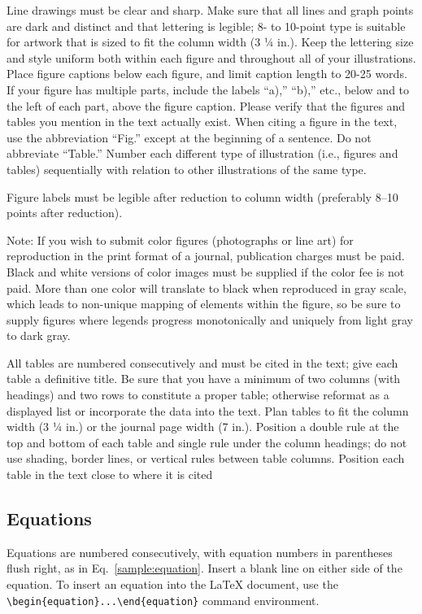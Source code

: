 \documentclass[journal]{new-aiaa}
\begin{document}
Line drawings must be clear and sharp. Make sure that all lines and graph points are dark and distinct and that lettering is legible; 8- to 10-point type is suitable for artwork that is sized to fit the column width (3 ¼ in.). Keep the lettering size and style uniform both within each figure and throughout all of your illustrations. Place figure captions below each figure, and limit caption length to 20-25 words. If your figure has multiple parts, include the labels “a),” “b),” etc., below and to the left of each part, above the figure caption. Please verify that the figures and tables you mention in the text actually exist. When citing a figure in the text, use the abbreviation “Fig.” except at the beginning of a sentence. Do not abbreviate “Table.” Number each different type of illustration (i.e., figures and tables) sequentially with relation to other illustrations of the same type.

Figure labels must be legible after reduction to column width (preferably 8--10 points after reduction).

Note: If you wish to submit color figures (photographs or line art) for reproduction in the print format of a journal, publication charges must be paid. Black and white versions of color images must be supplied if the color fee is not paid. More than one color will translate to black when reproduced in gray scale, which leads to non-unique mapping of elements within the figure, so be sure to supply figures where legends progress monotonically and uniquely from light gray to dark gray.

All tables are numbered consecutively and must be cited in the text; give each table a definitive title. Be sure that you have a minimum of two columns (with headings) and two rows to constitute a proper table; otherwise reformat as a displayed list or incorporate the data into the text. Plan tables to fit the column width (3 ¼ in.) or the journal page width (7 in.). Position a double rule at the top and bottom of each table and single rule under the column headings; do not use shading, border lines, or vertical rules between table columns. Position each table in the text close to where it is cited


\subsection{Equations}
Equations are numbered consecutively, with equation numbers in parentheses flush right, as in Eq.~\eqref{sample:equation}. Insert a blank line on either side of the equation. To insert an equation into the \LaTeX{} document, use the \verb|\begin{equation}...\end{equation}| command environment.
\end{document}

